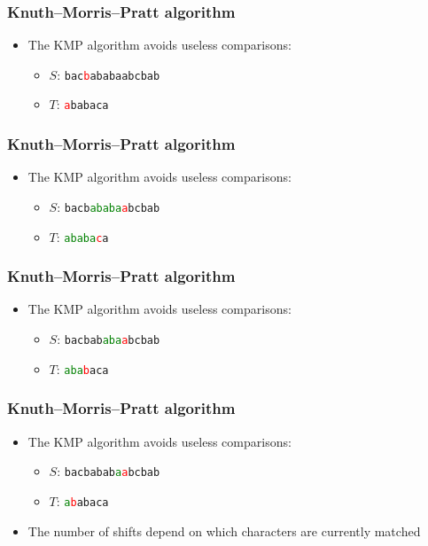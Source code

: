 \documentclass[12pt,t]{beamer}
\begin{document}
\begin{frame}
    \frametitle{Knuth--Morris--Pratt algorithm}
    \vspace{30pt}
    \begin{itemize}
    \item The KMP algorithm avoids useless comparisons:
        \begin{itemize}
            \item $S$: \texttt{bac\textcolor{red}{b}ababaabcbab}
            \item $T$: \texttt{\textcolor{red}{a}babaca}
        \end{itemize}
    \end{itemize}
\end{frame}
\begin{frame}
    \frametitle{Knuth--Morris--Pratt algorithm}
    \vspace{30pt}
    \begin{itemize}
    \item The KMP algorithm avoids useless comparisons:
        \begin{itemize}
            \item $S$: \texttt{bacb\textcolor{green}{ababa}\textcolor{red}{a}bcbab}
            \item $T$: \texttt{\textcolor{green}{ababa}\textcolor{red}{c}a}
        \end{itemize}
    \end{itemize}
\end{frame}
\begin{frame}
    \frametitle{Knuth--Morris--Pratt algorithm}
    \vspace{30pt}
    \begin{itemize}
    \item The KMP algorithm avoids useless comparisons:
        \begin{itemize}
            \item $S$: \texttt{bacbab\textcolor{green}{aba}\textcolor{red}{a}bcbab}
            \item $T$: \texttt{\textcolor{green}{aba}\textcolor{red}{b}aca}
        \end{itemize}
    \end{itemize}
\end{frame}
\begin{frame}
    \frametitle{Knuth--Morris--Pratt algorithm}
    \vspace{30pt}
    \begin{itemize}
    \item The KMP algorithm avoids useless comparisons:
        \begin{itemize}
            \item $S$: \texttt{bacbabab\textcolor{green}{a}\textcolor{red}{a}bcbab}
            \item $T$: \texttt{\textcolor{green}{a}\textcolor{red}{b}abaca}
        \end{itemize}
    \item<2-> The number of shifts depend on which characters are currently matched
    \end{itemize}
\end{frame}
\end{document}
